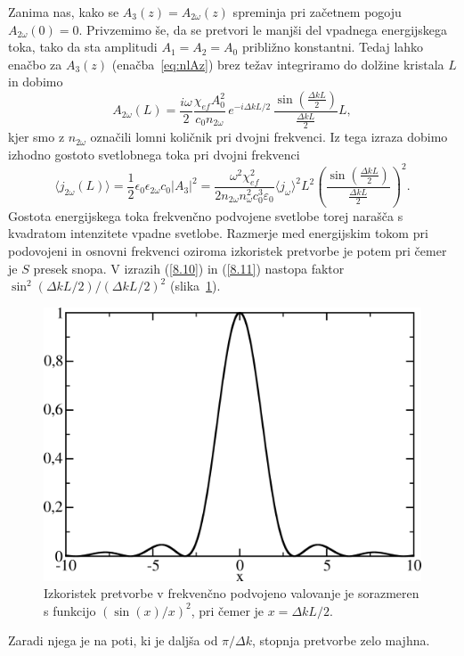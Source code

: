 Zanima nas, kako se $A_{3}(z) = A_{2\omega}(z)$ spreminja pri začetnem pogoju $A_{2\omega}(0)=0$.
Privzemimo še, da se pretvori le manjši del vpadnega energijskega toka,
tako da sta amplitudi $A_{1}=A_{2}=A_0$ približno konstantni. Tedaj lahko
enačbo za $A_{3}(z)$ (enačba~\ref{eq:nlAz}) brez težav integriramo do dolžine kristala $L$ in dobimo
\begin{equation}
A_{2\omega}(L)=\frac{i\omega}{2}\frac{\chi_{ef} A_0^2}{c_0 n_{2\omega}}
\,e^{-i\Delta kL/2}\, \frac{\sin\left(\frac{\Delta k L}{2}\right)}{\frac{\Delta kL}{2}}L,
\label{8.9}
\end{equation}
kjer smo z $n_{2\omega}$ označili lomni količnik pri dvojni frekvenci.
Iz tega izraza dobimo izhodno gostoto svetlobnega toka pri dvojni
frekvenci 
\begin{equation}
\langle j_{2\omega}(L) \rangle=\frac{1}{2}\epsilon_{0}\epsilon_{2\omega}c_0|A_3|^2 = 
\frac{\omega^2 \chi_{ef}^2}{2 n_{2\omega} n_\omega^2c_0^3\varepsilon_0}\langle j_\omega\rangle^2 L^2
\left(\frac{\sin\left(\frac{\Delta k L}{2}\right)}{\frac{\Delta kL}{2}}\right)^2.
\label{8.10}
\end{equation}
Gostota energijskega toka frekvenčno podvojene svetlobe torej narašča s kvadratom
intenzitete vpadne svetlobe. Razmerje med energijskim tokom pri podovojeni in osnovni frekvenci oziroma
izkoristek pretvorbe je potem
pri čemer je $S$ presek snopa. V izrazih (\ref{8.10}) in (\ref{8.11}) nastopa 
faktor $\sin^{2}(\Delta kL/2)/(\Delta kL/2)^{2}$ (slika~\ref{fig:shg2}). 
\begin{figure}[h]
\centering
\includegraphics[width=8truecm]{slike/08_shg2.png}
\caption{Izkoristek pretvorbe v frekvenčno podvojeno valovanje je sorazmeren s funkcijo $(\sin(x)/x)^2$,
pri čemer je $x = \Delta k L/2$.}
\label{fig:shg2}
\end{figure}
Zaradi njega je na poti, ki je daljša od $\pi /\Delta k$, stopnja pretvorbe zelo majhna.

